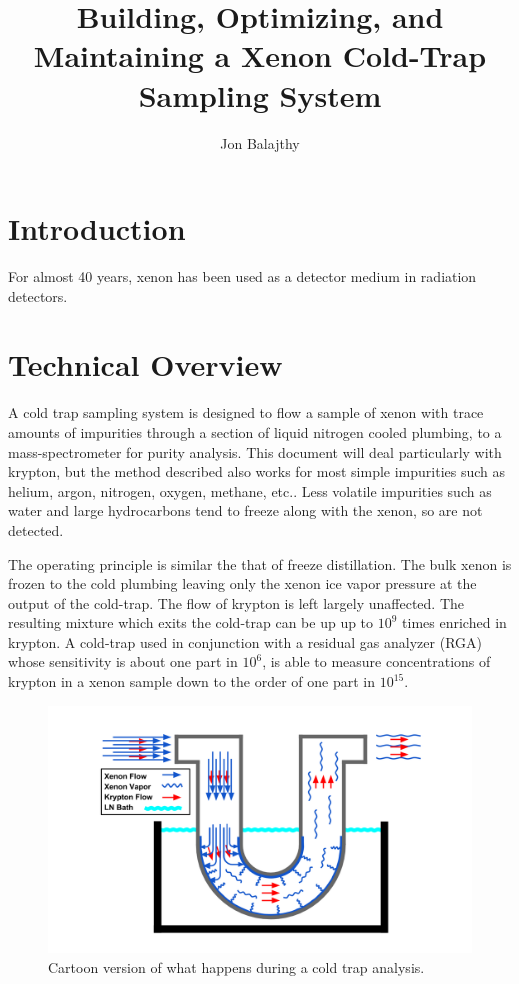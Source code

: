 \documentclass[12pt]{article}
\title{Building, Optimizing, and Maintaining a Xenon Cold-Trap Sampling System}
\author
{Jon Balajthy}
\date{}
\begin{document}
 

\baselineskip24pt


\maketitle 




\begin{abstract}

\end{abstract}

\section{Introduction}
For almost 40 years, xenon has been used as a detector medium in radiation detectors. 

\section{Technical Overview}
A cold trap sampling system is designed to flow a sample of xenon with trace amounts of impurities through a section of liquid nitrogen cooled plumbing, to a mass-spectrometer for purity analysis. This document will deal particularly with krypton, but the method described also works for most simple impurities  such as helium, argon, nitrogen, oxygen, methane, etc.. Less volatile impurities such as water and large hydrocarbons tend to freeze along with the xenon, so are not detected. 

The operating principle is similar the that of freeze distillation. The bulk xenon is frozen to the cold plumbing leaving only the xenon ice vapor pressure at the output of the cold-trap. The flow of krypton is left largely unaffected. The resulting mixture which exits the cold-trap can be up up to $10^9$ times enriched in krypton. A cold-trap used in conjunction with a residual gas analyzer (RGA) whose sensitivity is about one part in $10^6$, is able to measure concentrations of krypton in a xenon sample down to the order of one part in $10^{15}$.
\begin{figure}[h]
  \includegraphics[width=\linewidth]{Figures/Cold_Trap_cartoon.png}
  \caption{Cartoon version of what happens during a cold trap analysis. }
  \label{fig:CTcartoon}
\end{figure}
\end{document}
